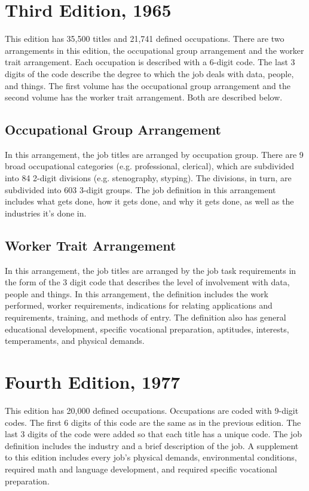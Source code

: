 \documentclass[11pt]{article}
\begin{document}
\section*{Third Edition, 1965}

This edition has 35,500 titles and 21,741 defined occupations. There are two arrangements in this edition, the occupational group arrangement and the worker trait arrangement. Each occupation is described with a 6-digit code. The last 3 digits of the code describe the degree to which the job deals with data, people, and things. The first volume has the occupational group arrangement and the second volume has the worker trait arrangement. Both are described below.

\subsection*{Occupational Group Arrangement}
In this arrangement, the job titles are arranged by occupation group. There are 9 broad occupational categories (e.g. professional, clerical), which are subdivided into 84 2-digit divisions (e.g. stenography, styping). The divisions, in turn, are subdivided into 603 3-digit groups. The job definition in this arrangement includes what gets done, how it gets done, and why it gets done, as well as the industries it's done in.

\subsection*{Worker Trait Arrangement}
In this arrangement, the job titles are arranged by the job task requirements in the form of the 3 digit code that describes the level of involvement with data, people and things. In this arrangement, the definition includes the work performed, worker requirements, indications for relating applications and requirements, training, and methods of entry. The definition also has general educational development, specific vocational preparation, aptitudes, interests, temperaments, and physical demands.

\section*{Fourth Edition, 1977}
This edition has 20,000 defined occupations. Occupations are coded with 9-digit codes. The first 6 digits of this code are the same as in the previous edition. The last 3 digits of the code were added so that each title has a unique code. The job definition includes the industry and a brief description of the job. A supplement to this edition includes every job's physical demands, environmental conditions, required math and language development, and required specific vocational preparation.
\end{document}
